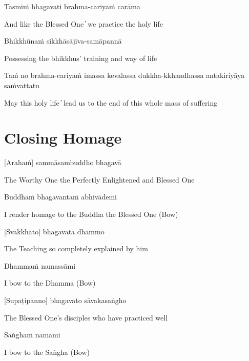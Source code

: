 Tasmiṁ bhagavati brahma-cariyaṁ carāma

\begin{cprenglish}
  And like the Blessed One  ̓  we practice the holy life
\end{cprenglish}

Bhikkhūnaṁ sikkhāsājīva-samāpannā

\begin{cprenglish}
  Possessing the bhikkhus’ training and way of life
\end{cprenglish}

Taṁ no brahma-cariyaṁ imassa kevalassa dukkha-kkhandhassa antakiriyāya saṁvattatu

\begin{cprenglish}
  May this holy life  ̓  lead us to the end of this whole mass of suffering
\end{cprenglish}

\chapter{Closing Homage}

[Arahaṁ] sammāsambuddho bhagavā

\begin{cprenglish}
  The Worthy One the Perfectly Enlightened and Blessed One
\end{cprenglish}

Buddhaṁ bhagavantaṁ abhivādemi

\begin{cprenglish}
  I render homage to the Buddha the Blessed One (Bow)
\end{cprenglish}

[Svākkhāto] bhagavatā dhammo

\begin{cprenglish}
  The Teaching so completely explained by him
\end{cprenglish}

Dhammaṁ namassāmi

\begin{cprenglish}
I bow to the Dhamma (Bow)
\end{cprenglish}

[Supaṭipanno] bhagavato sāvakasaṅgho

\begin{cprenglish}
  The Blessed One’s disciples who have practiced well
\end{cprenglish}

Saṅghaṁ namāmi

\begin{cprenglish}
  I bow to the Saṅgha (Bow)
\end{cprenglish}

